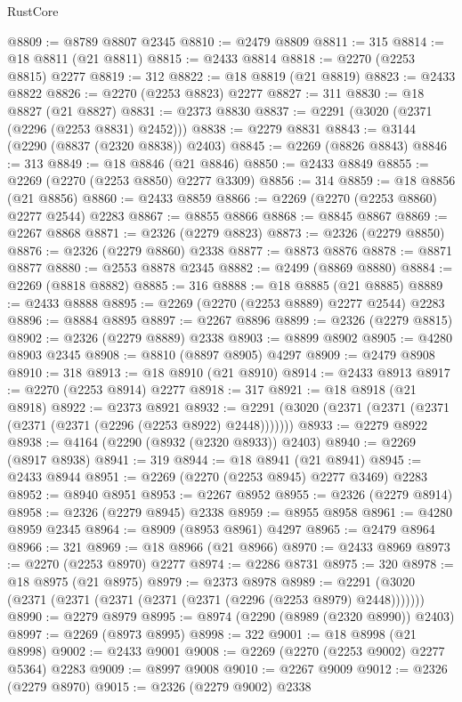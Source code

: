 \begin{lexlean}{RustCore}
\begin{coremodule}
@8809 := @8789 @8807 @2345
@8810 := @2479 @8809
@8811 := 315
@8814 := @18 @8811 (@21 @8811)
@8815 := @2433 @8814
@8818 := @2270 (@2253 @8815) @2277
@8819 := 312
@8822 := @18 @8819 (@21 @8819)
@8823 := @2433 @8822
@8826 := @2270 (@2253 @8823) @2277
@8827 := 311
@8830 := @18 @8827 (@21 @8827)
@8831 := @2373 @8830
@8837 := @2291 (@3020 (@2371 (@2296 (@2253 @8831) @2452)))
@8838 := @2279 @8831
@8843 := @3144 (@2290 (@8837 (@2320 @8838)) @2403)
@8845 := @2269 (@8826 @8843)
@8846 := 313
@8849 := @18 @8846 (@21 @8846)
@8850 := @2433 @8849
@8855 := @2269 (@2270 (@2253 @8850) @2277 @3309)
@8856 := 314
@8859 := @18 @8856 (@21 @8856)
@8860 := @2433 @8859
@8866 := @2269 (@2270 (@2253 @8860) @2277 @2544) @2283
@8867 := @8855 @8866
@8868 := @8845 @8867
@8869 := @2267 @8868
@8871 := @2326 (@2279 @8823)
@8873 := @2326 (@2279 @8850)
@8876 := @2326 (@2279 @8860) @2338
@8877 := @8873 @8876
@8878 := @8871 @8877
@8880 := @2553 @8878 @2345
@8882 := @2499 (@8869 @8880)
@8884 := @2269 (@8818 @8882)
@8885 := 316
@8888 := @18 @8885 (@21 @8885)
@8889 := @2433 @8888
@8895 := @2269 (@2270 (@2253 @8889) @2277 @2544) @2283
@8896 := @8884 @8895
@8897 := @2267 @8896
@8899 := @2326 (@2279 @8815)
@8902 := @2326 (@2279 @8889) @2338
@8903 := @8899 @8902
@8905 := @4280 @8903 @2345
@8908 := @8810 (@8897 @8905) @4297
@8909 := @2479 @8908
@8910 := 318
@8913 := @18 @8910 (@21 @8910)
@8914 := @2433 @8913
@8917 := @2270 (@2253 @8914) @2277
@8918 := 317
@8921 := @18 @8918 (@21 @8918)
@8922 := @2373 @8921
@8932 := @2291 (@3020 (@2371 (@2371 (@2371 (@2371 (@2371 (@2296 (@2253 @8922) @2448)))))))
@8933 := @2279 @8922
@8938 := @4164 (@2290 (@8932 (@2320 @8933)) @2403)
@8940 := @2269 (@8917 @8938)
@8941 := 319
@8944 := @18 @8941 (@21 @8941)
@8945 := @2433 @8944
@8951 := @2269 (@2270 (@2253 @8945) @2277 @3469) @2283
@8952 := @8940 @8951
@8953 := @2267 @8952
@8955 := @2326 (@2279 @8914)
@8958 := @2326 (@2279 @8945) @2338
@8959 := @8955 @8958
@8961 := @4280 @8959 @2345
@8964 := @8909 (@8953 @8961) @4297
@8965 := @2479 @8964
@8966 := 321
@8969 := @18 @8966 (@21 @8966)
@8970 := @2433 @8969
@8973 := @2270 (@2253 @8970) @2277
@8974 := @2286 @8731
@8975 := 320
@8978 := @18 @8975 (@21 @8975)
@8979 := @2373 @8978
@8989 := @2291 (@3020 (@2371 (@2371 (@2371 (@2371 (@2371 (@2296 (@2253 @8979) @2448)))))))
@8990 := @2279 @8979
@8995 := @8974 (@2290 (@8989 (@2320 @8990)) @2403)
@8997 := @2269 (@8973 @8995)
@8998 := 322
@9001 := @18 @8998 (@21 @8998)
@9002 := @2433 @9001
@9008 := @2269 (@2270 (@2253 @9002) @2277 @5364) @2283
@9009 := @8997 @9008
@9010 := @2267 @9009
@9012 := @2326 (@2279 @8970)
@9015 := @2326 (@2279 @9002) @2338

\end{coremodule}
\end{lexlean}
